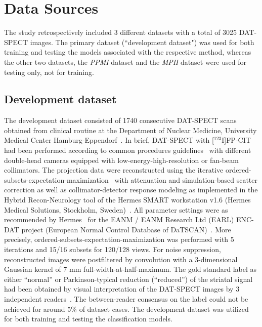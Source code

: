 \section{Data Sources}
\label{sec:data}

The study retrospectively included 3 different datasets with a total of 3025 DAT-SPECT images.
The primary dataset (``development dataset") was used for both training and testing the models associated with the respective method, 
whereas the other two datasets, the \textit{PPMI} dataset and the \textit{MPH} dataset were used for testing only, not for training.

\subsection{Development dataset}
\label{subsec:spect_dataset}

The development dataset consisted of 1740 consecutive DAT-SPECT scans obtained from clinical routine at 
the Department of Nuclear Medicine, University Medical Center Hamburg-Eppendorf~\citep{Schiebler2023}.
In brief, DAT-SPECT with [$^{123}$I]FP-CIT had been performed according to common procedures guidelines~\citep{Darcourt2010-ar, Djang2012-ow} 
with different double-head cameras equipped with low-energy-high-resolution or fan-beam collimators. 
The projection data were reconstructed using the iterative ordered-subsets-expectation-maximization~\citep{Hudson1994} 
with attenuation and simulation-based scatter correction 
as well as collimator-detector response modeling as implemented in the Hybrid Recon-Neurology tool 
of the Hermes SMART workstation v1.6 (Hermes Medical Solutions, Stockholm, Sweden)~\citep{Diemling2021-mg, Sohlberg2012-ep, HybridRecon, Kangasmaa2016-aw}.
All parameter settings were as recommended by Hermes~\citep{Diemling2021-mg} for the EANM / EANM Research Ltd (EARL) ENC-DAT project (European Normal Control Database of DaTSCAN)~\citep{Tossici-Bolt2011-cx, Dickson2010-fm, Varrone2013-it, Tossici-Bolt2017-xj, Dickson2012-hk}.
More precisely, ordered-subsets-expectation-maximization was performed with 5 iterations and 15/16 subsets for 120/128 views. 
For noise suppression, reconstructed images were postfiltered by convolution with a 3-dimensional Gaussian kernel of 7 mm full-width-at-half-maximum. 
The gold standard label as either “normal” or Parkinson-typical reduction (“reduced”) of the striatal signal had been obtained by visual interpretation of the DAT-SPECT images by 3 independent readers~\citep{Schiebler2023}. 
The between-reader consensus on the label could not be achieved for around 5\% of dataset cases.
The development dataset was utilized for both training and testing the classification models. 

